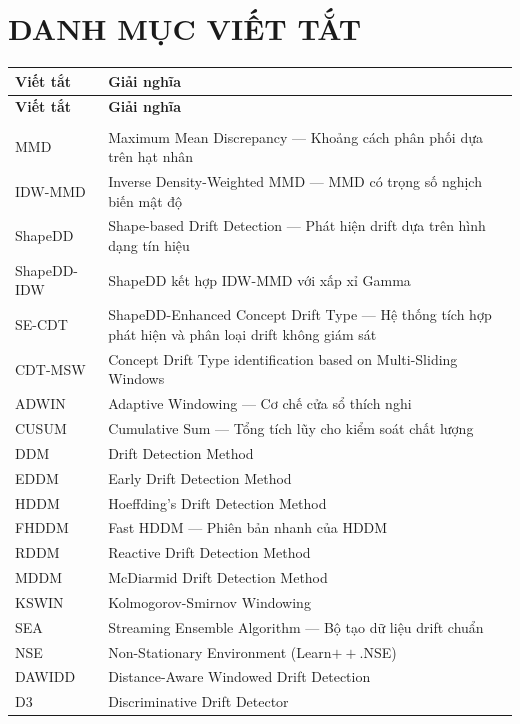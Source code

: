 \chapter*{DANH MỤC VIẾT TẮT}

\begin{longtable}[c]{|l|p{12cm}|}
	\hline
	\textbf{Viết tắt} & \textbf{Giải nghĩa} \\
	\hline
	\endfirsthead
	\hline
	\textbf{Viết tắt} & \textbf{Giải nghĩa} \\
	\hline
	\endhead
	\hline
	\endfoot
	\multicolumn{2}{|c|}{\textit{Phương pháp và thuật toán}} \\
	\hline
	MMD & Maximum Mean Discrepancy --- Khoảng cách phân phối dựa trên hạt nhân \\
	IDW-MMD & Inverse Density-Weighted MMD --- MMD có trọng số nghịch biến mật độ \\
	ShapeDD & Shape-based Drift Detection --- Phát hiện drift dựa trên hình dạng tín hiệu \\
	ShapeDD-IDW & ShapeDD kết hợp IDW-MMD với xấp xỉ Gamma \\
	SE-CDT & ShapeDD-Enhanced Concept Drift Type --- Hệ thống tích hợp phát hiện và phân loại drift không giám sát \\
	CDT-MSW & Concept Drift Type identification based on Multi-Sliding Windows \\
	ADWIN & Adaptive Windowing --- Cơ chế cửa sổ thích nghi \\
	CUSUM & Cumulative Sum --- Tổng tích lũy cho kiểm soát chất lượng \\
	DDM & Drift Detection Method \\
	EDDM & Early Drift Detection Method \\
	HDDM & Hoeffding's Drift Detection Method \\
	FHDDM & Fast HDDM --- Phiên bản nhanh của HDDM \\
	RDDM & Reactive Drift Detection Method \\
	MDDM & McDiarmid Drift Detection Method \\
	KSWIN & Kolmogorov-Smirnov Windowing \\
	SEA & Streaming Ensemble Algorithm --- Bộ tạo dữ liệu drift chuẩn \\
	NSE & Non-Stationary Environment (Learn$++$.NSE) \\
	DAWIDD & Distance-Aware Windowed Drift Detection \\
	D3 & Discriminative Drift Detector \\

\end{longtable}
